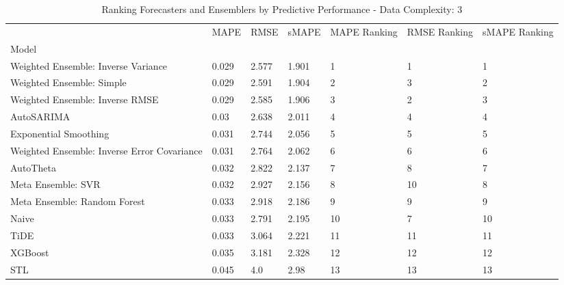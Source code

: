 \begin{table}
\caption{Ranking Forecasters and Ensemblers by Predictive Performance - Data Complexity: 3}
\begin{tabular}{lllllll}
\toprule
 & MAPE & RMSE & sMAPE & MAPE Ranking & RMSE Ranking & sMAPE Ranking \\
Model &  &  &  &  &  &  \\
\midrule
Weighted Ensemble: Inverse Variance & 0.029 & 2.577 & 1.901 & 1 & 1 & 1 \\
Weighted Ensemble: Simple & 0.029 & 2.591 & 1.904 & 2 & 3 & 2 \\
Weighted Ensemble: Inverse RMSE & 0.029 & 2.585 & 1.906 & 3 & 2 & 3 \\
AutoSARIMA & 0.03 & 2.638 & 2.011 & 4 & 4 & 4 \\
Exponential Smoothing & 0.031 & 2.744 & 2.056 & 5 & 5 & 5 \\
Weighted Ensemble: Inverse Error Covariance & 0.031 & 2.764 & 2.062 & 6 & 6 & 6 \\
AutoTheta & 0.032 & 2.822 & 2.137 & 7 & 8 & 7 \\
Meta Ensemble: SVR & 0.032 & 2.927 & 2.156 & 8 & 10 & 8 \\
Meta Ensemble: Random Forest & 0.033 & 2.918 & 2.186 & 9 & 9 & 9 \\
Naive & 0.033 & 2.791 & 2.195 & 10 & 7 & 10 \\
TiDE & 0.033 & 3.064 & 2.221 & 11 & 11 & 11 \\
XGBoost & 0.035 & 3.181 & 2.328 & 12 & 12 & 12 \\
STL & 0.045 & 4.0 & 2.98 & 13 & 13 & 13 \\
\bottomrule
\end{tabular}
\end{table}
